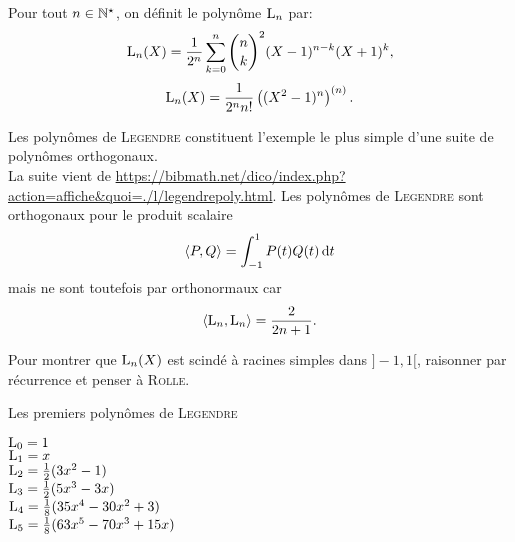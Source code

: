 \begin{tcolorbox}
    Pour tout $n \in \mathbb{N}^\star$, on définit le polynôme $\mathrm{L}_n$ par:
    $$\mathrm{L}_n(X) = \frac{1}{2^n} \sum_{k=0}^{n} \binom{n}{k}^2 (X-1)^{n-k}(X+1)^{k},$$
    $$\mathrm{L}_n(X) = \frac{1}{2^n n!} \left( (X^2-1)^n \right)^{(n)}.$$
\end{tcolorbox}

Les polynômes de \textsc{Legendre} constituent l'exemple le plus simple d'une suite de polynômes orthogonaux. \\
La suite vient de \url{https://bibmath.net/dico/index.php?action=affiche&quoi=./l/legendrepoly.html}.
Les polynômes de \textsc{Legendre} sont orthogonaux pour le produit scalaire
$$\langle P, Q \rangle = \int_{-1}^1 P(t) Q(t) \, \mathrm{d} t$$
mais ne sont toutefois par orthonormaux car
$$\langle \mathrm{L}_n, \mathrm{L}_n \rangle = \frac{2}{2n+1}.$$

\begin{elem_sol}
    Pour montrer que $\mathrm{L}_n(X)$ est scindé à racines simples dans $]-1, 1[$, raisonner par récurrence et penser à \textsc{Rolle}. 
\end{elem_sol}

\begin{marginfigure}[-6cm]
	
	\caption{Les premiers polynômes de \textsc{Legendre}}
	{\scriptsize
	\color{blue} $\mathrm{L}_0 = 1$ \\ 
	\color{red} $\mathrm{L}_1 = x$ \\
	\color{green} $\mathrm{L}_2 = \frac{1}{2}(3x^2-1)$ \\
	\color{purple} $\mathrm{L}_3 = \frac{1}{2}(5x^3-3x)$ \\
	\color{black} $\mathrm{L}_4 = \frac{1}{8}(35x^4-30x^2+3)$ \\
	\color{orange} $\mathrm{L}_5 = \frac{1}{8}(63x^5-70x^3+15x)$
	}
\end{marginfigure}

